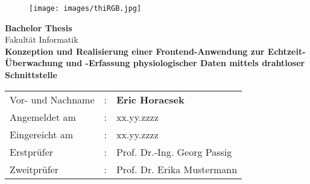 

\begin{titlepage}	
		\begin{figure}[!h]
			\centering
			\texttt{[image: images/thiRGB.jpg]}	
		\end{figure}																			
	
	\begin{center}
		\hrulefill 
	\end{center}
	
	
	\begin{center}	
		\vspace{1cm}
		
		\huge\textbf{
			Bachelor Thesis}\\[2.5em]
		\normalsize
			Fakultät Informatik	\\ [7em]
	
		\Large\textbf{Konzeption und Realisierung einer Frontend-Anwendung zur Echtzeit-Überwachung und -Erfassung physiologischer Daten mittels drahtloser Schnittstelle}	 \\ 

	\end{center}

	\vfill
	
	
	\begin{tabular}{lll}
		Vor- und Nachname&: & \textbf{Eric Horacsek}	\\ [3em]
		
		Angemeldet am&:	& xx.yy.zzzz	\\ [1em] %
		Eingereicht am &:	& xx.yy.zzzz	\\ [3em] %
		
		Erstprüfer &: 	& Prof. Dr.-Ing. Georg Passig	\\ [1em]
		Zweitprüfer &: 	& Prof. Dr. Erika Mustermann	\\[3em]
		
	\end{tabular}
	
\end{titlepage}

\restoregeometry